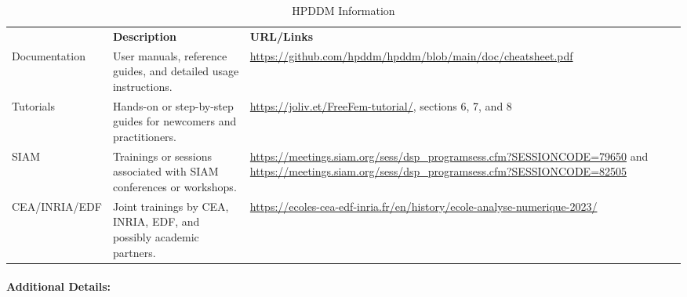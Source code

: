 \begin{table}[H]
{{    {
    \setlength{\parindent}{0pt}
    \def\arraystretch{1.25}
    {\fontsize{9}{11}\selectfont
    \begin{tabular}{!{\color{numpexgray}\vrule}p{0.20\textwidth}
                    !{\color{numpexgray}\vrule}p{0.40\textwidth}
                    !{\color{numpexgray}\vrule}p{0.35\textwidth}
                    !{\color{numpexgray}\vrule}}
         & {\rule{0pt}{2.5ex}\color{white}\bf Description}
         & {\rule{0pt}{2.5ex}\color{white}\bf URL/Links} \\
        Documentation & User manuals, reference guides, and detailed usage instructions. & \url{https://github.com/hpddm/hpddm/blob/main/doc/cheatsheet.pdf}\\
        Tutorials & Hands-on or step-by-step guides for newcomers and practitioners. & \url{https://joliv.et/FreeFem-tutorial/}, sections 6, 7, and 8\\
        SIAM & Trainings or sessions associated with SIAM conferences or workshops. & \url{https://meetings.siam.org/sess/dsp_programsess.cfm?SESSIONCODE=79650} and \url{https://meetings.siam.org/sess/dsp_programsess.cfm?SESSIONCODE=82505} \\
        CEA/INRIA/EDF & Joint trainings by CEA, INRIA, EDF, and possibly academic partners. & \url{https://ecoles-cea-edf-inria.fr/en/history/ecole-analyse-numerique-2023/} \\
\bottomrule
    \end{tabular}
        }}    
        }}
    \caption{HPDDM Information}
\end{table}

\paragraph{Additional Details:}

